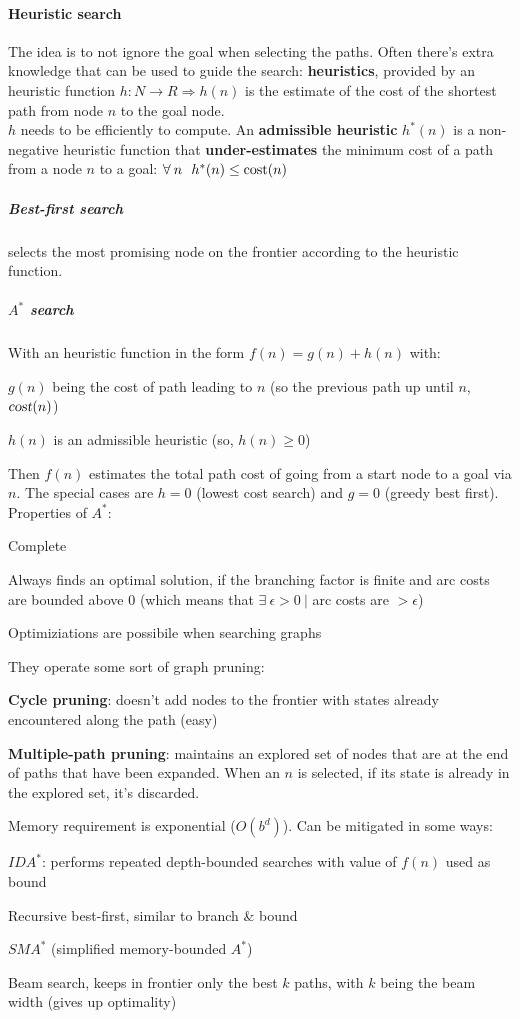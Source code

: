 \documentclass[10pt]{report}
\begin{document}
\paragraph{Heuristic search} The idea is to not ignore the goal when selecting the paths. Often there's extra knowledge that can be used to guide the search: \textbf{heuristics}, provided by an heuristic function $h:N\rightarrow R \Rightarrow h(n)$ is the estimate of the cost of the shortest path from node $n$ to the goal node.\\
$h$ needs to be efficiently to compute. An \textbf{admissible heuristic} $h^*(n)$ is a non-negative heuristic function that \textbf{under-estimates} the minimum cost of a path from a node $n$ to a goal: $\forall\:n\:\:\:h^*(n) \leq \hbox{cost}(n)$
\subparagraph{Best-first search} selects the most promising node on the frontier according to the heuristic function.
\subparagraph{$A^*$ search} With an heuristic function in the form $f(n) = g(n) + h(n)$ with:
\begin{list}{}{}
	\item $g(n)$ being the cost of path leading to $n$ (so the previous path up until $n$, $\textsl{cost}(n)$)
	\item $h(n)$ is an admissible heuristic (so, $h(n) \geq 0$)
\end{list}
Then $f(n)$ estimates the total path cost of going from a start node to a goal via $n$. The special cases are $h = 0$ (lowest cost search) and $g = 0$ (greedy best first).\\
Properties of $A^*$:\begin{list}{}{}
	\item Complete
	\item Always finds an optimal solution, if the branching factor is finite and arc costs are bounded above 0 (which means that $\exists\:\epsilon > 0\:|$ arc costs are $> \epsilon$)
	\item Optimiziations are possibile when searching graphs
	\item They operate some sort of graph pruning:
	\begin{list}{}{}
		\item \textbf{Cycle pruning}: doesn't add nodes to the frontier with states already encountered along the path (easy)
		\item \textbf{Multiple-path pruning}: maintains an explored set of nodes that are at the end of paths that have been expanded. When an $n$ is selected, if its state is already in the explored set, it's discarded.
	\end{list}
	\item Memory requirement is exponential ($O(b^d)$). Can be mitigated in some ways:
	\begin{list}{}{}
		\item $IDA^*$: performs repeated depth-bounded searches with value of $f(n)$ used as bound
		\item Recursive best-first, similar to branch \& bound
		\item $SMA^*$ (simplified memory-bounded $A^*$)
		\item Beam search, keeps in frontier only the best $k$ paths, with $k$ being the beam width (gives up optimality)
	\end{list}
\end{list}
\end{document}
